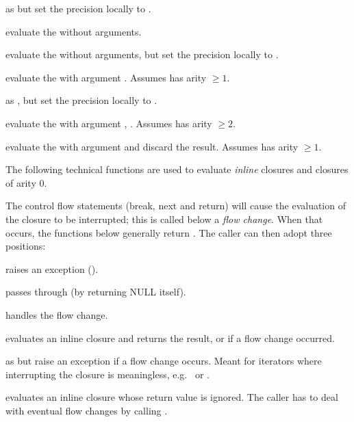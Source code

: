  as
 but set the precision locally to .

 evaluate the 
 without arguments.

 evaluate the 
 without arguments, but set the precision locally to .

 evaluate the 
 with argument . Assumes  has arity $\geq 1$.

 as
, but set the precision locally to .

 evaluate the 
 with argument , . Assumes  has arity $\geq 2$.

 evaluate the 
 with argument  and discard the result. Assumes 
has arity $\geq 1$.

The following technical functions are used to evaluate \emph{inline}
closures and closures of arity 0.

The control flow statements (break, next and return) will cause the
evaluation of the closure to be interrupted; this is called below a
\emph{flow change}. When that occurs, the functions below generally
 return . The caller can then adopt three positions:

\item raises an exception ().

\item passes through (by returning NULL itself).

\item handles the flow change.

 evaluates an inline closure and returns
the result, or  if a flow change occurred.

 as  but raise
an exception if a flow change occurs. Meant for iterators where
interrupting the closure is meaningless, e.g.~ or .

 evaluates an inline closure whose return
value is ignored. The caller has to deal with eventual flow changes by
calling .

